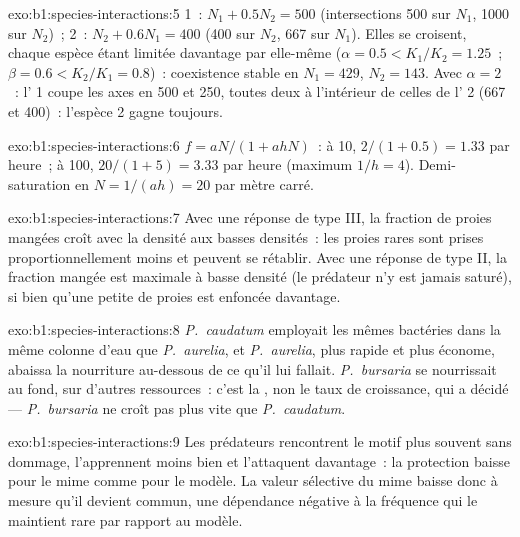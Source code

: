 \begin{solution}{exo:b1:species-interactions:5}
 1~: $N_1 + 0.5 N_2 = 500$ (intersections 500 sur $N_1$, 1000
sur $N_2$)~;  2~: $N_2 + 0.6 N_1 = 400$ (400 sur $N_2$, 667 sur $N_1$).
Elles se croisent, chaque espèce étant limitée davantage par elle-même
($\alpha = 0.5 <
K_1/K_2 = 1.25$~; $\beta = 0.6 < K_2/K_1 = 0.8$)~: coexistence stable
en $N_1 = 429$, $N_2 = 143$. Avec $\alpha = 2$~: l' 1 coupe les
axes en 500 et 250, toutes deux à l'intérieur de celles de l' 2
(667 et 400)~: l'espèce 2 gagne toujours.
\end{solution}

\begin{solution}{exo:b1:species-interactions:6}
$f = aN/(1 + ahN)$~: à 10, $2/(1 + 0.5) = 1.33$ par heure~; à 100,
$20/(1 + 5) = 3.33$ par heure (maximum $1/h = 4$). Demi-saturation en
$N = 1/(ah) = 20$ par mètre carré.
\end{solution}

\begin{solution}{exo:b1:species-interactions:7}
Avec une réponse de type III, la fraction de proies mangées croît avec
la densité aux basses densités~: les proies rares sont prises
proportionnellement moins et peuvent se rétablir. Avec une réponse de
type II, la fraction mangée est maximale à basse densité (le prédateur
n'y est jamais saturé), si bien qu'une petite  de proies est
enfoncée davantage.
\end{solution}

\begin{solution}{exo:b1:species-interactions:8}
\emph{P.~caudatum} employait les mêmes bactéries dans la même colonne
d'eau que \emph{P.~aurelia}, et \emph{P.~aurelia}, plus rapide et plus
économe, abaissa la nourriture au-dessous de ce qu'il lui fallait.
\emph{P.~bursaria} se nourrissait au fond, sur d'autres ressources~:
c'est la , non le taux de croissance, qui a décidé ---
\emph{P.~bursaria} ne croît pas plus vite que \emph{P.~caudatum}.
\end{solution}

\begin{solution}{exo:b1:species-interactions:9}
Les prédateurs rencontrent le motif plus souvent sans dommage,
l'apprennent moins bien et l'attaquent davantage~: la protection baisse
pour le mime comme pour le modèle. La valeur sélective du mime baisse
donc à mesure qu'il devient commun, une dépendance négative à la
fréquence qui le maintient rare par rapport au modèle.
\end{solution}

